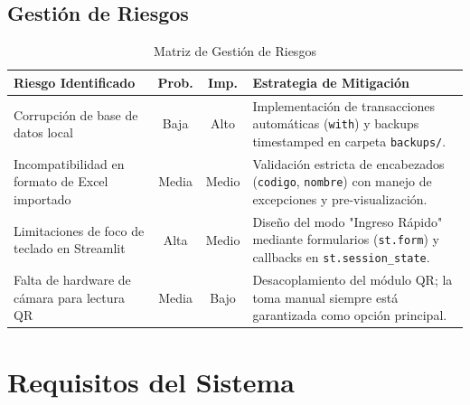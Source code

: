 \documentclass[12pt,a4paper]{article}
\begin{document}
\subsection{Gestión de Riesgos}
\begin{table}[h!]
\centering
\caption{Matriz de Gestión de Riesgos}
\begin{tabularx}{\textwidth}{X c c X}
\toprule
\textbf{Riesgo Identificado} & \textbf{Prob.} & \textbf{Imp.} & \textbf{Estrategia de Mitigación} \\
\midrule
Corrupción de base de datos local & Baja & Alto & Implementación de transacciones automáticas (\texttt{with}) y backups timestamped en carpeta \texttt{backups/}. \\
Incompatibilidad en formato de Excel importado & Media & Medio & Validación estricta de encabezados (\texttt{codigo}, \texttt{nombre}) con manejo de excepciones y pre-visualización. \\
Limitaciones de foco de teclado en Streamlit & Alta & Medio & Diseño del modo "Ingreso Rápido" mediante formularios (\texttt{st.form}) y callbacks en \texttt{st.session\_state}. \\
Falta de hardware de cámara para lectura QR & Media & Bajo & Desacoplamiento del módulo QR; la toma manual siempre está garantizada como opción principal. \\
\bottomrule
\end{tabularx}
\end{table}

\section{Requisitos del Sistema}
\end{document}
